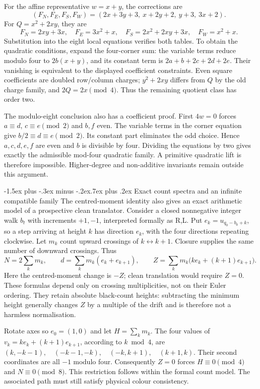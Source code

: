 \documentclass[11pt,letterpaper]{article}
\makeatletter
\renewcommand\subsection{\@startsection{subsection}{2}{\z@}%
  {-1.5ex plus -.3ex minus -.2ex}{.7ex plus .2ex}%
  {\normalfont\large\bfseries}}
\makeatother
\begin{document}
For the affine representative $w=x+y$, the corrections are
\[
(F_N,F_E,F_S,F_W)=(2x+3y+3,\ x+2y+2,\ y+3,\ 3x+2).
\]
For $Q=x^2+2xy$, they are
\[
F_N=2xy+3x,\quad F_E=3x^2+x,\quad
F_S=2x^2+2xy+3x,\quad F_W=x^2+x.
\]
Substitution into the eight local equations verifies both tables.
To obtain the quadratic conditions, expand the four-corner sum:
the variable terms reduce modulo four to $2b(x+y)$, and its
constant term is $2a+b+2c+2d+2e$. Their vanishing is equivalent
to the displayed coefficient constraints. Even square coefficients are
doubled row/column charges; $y^2+2xy$ differs from $Q$ by the
old charge family, and $2Q=2x\pmod4$. Thus the remaining quotient
class has order two.

The modulo-eight conclusion also has a coefficient proof. First $4w=0$
forces $a\equiv d$, $c\equiv e\pmod2$ and $b,f$ even.
The variable terms in the corner equation give
$b/2\equiv d\equiv e\pmod2$. Its constant part eliminates the
odd choice. Hence $a,c,d,e,f$ are even and $b$ is divisible by
four. Dividing the equations by two gives exactly the admissible
mod-four quadratic family. A primitive quadratic lift is therefore impossible. Higher-degree and
non-additive invariants remain outside this argument.

\subsection{Exact count spectra and an infinite compatible family}
The centred-moment identity also gives an exact arithmetic model of a
prospective clean translator. Consider a closed nonnegative integer walk
$b_t$ with increments $+1,-1$, interpreted formally as R,L. Put
$e_k=u_{q_0-b_0+k}$, so a step arriving at height $k$ has direction
$e_k$, with the four directions repeating clockwise.
Let $m_k$ count upward crossings of $k\leftrightarrow k+1$.
Closure supplies the same number of downward crossings. Thus
\[
N=2\sum_km_k,\qquad
d=\sum_km_k(e_k+e_{k+1}),\qquad
Z=\sum_km_k\bigl(ke_k+(k+1)e_{k+1}\bigr).
\]
Here the centred-moment change is $-Z$; clean translation would
require $Z=0$. These formulas depend only on crossing multiplicities,
not on their Euler ordering. They retain absolute black-count heights:
subtracting the minimum height generally changes $Z$ by a multiple
of the drift and is therefore not a harmless normalisation.

Rotate axes so $e_0=(1,0)$ and let $H=\sum_km_k$. The four values of
$v_k=ke_k+(k+1)e_{k+1}$, according to $k\bmod4$, are
$(k,-k-1),\quad(-k-1,-k),\quad(-k,k+1),\quad(k+1,k)$.
Their second coordinates are all $-1$ modulo four. Consequently
$Z=0$ forces $H\equiv0\pmod4$ and $N\equiv0\pmod8$.
This restriction follows within the formal count model. The associated
path must still satisfy physical colour consistency.
\end{document}
